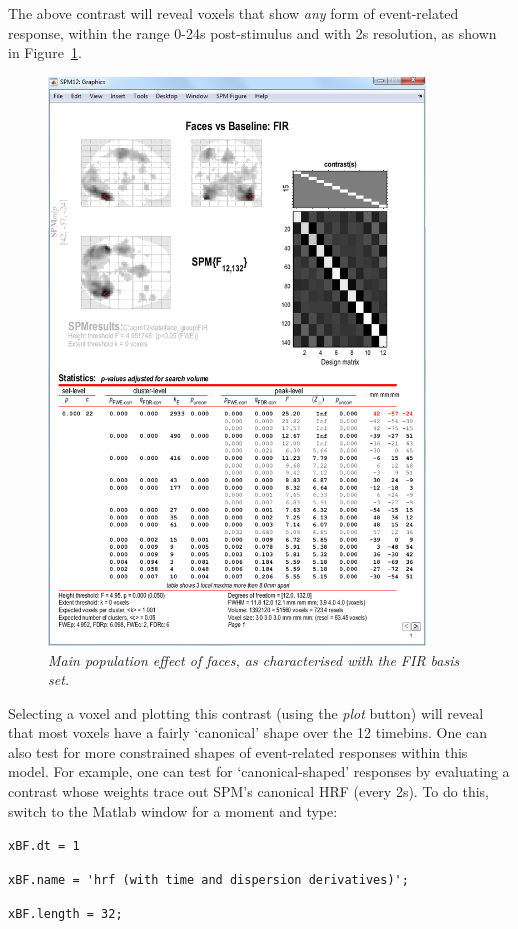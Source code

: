 The above contrast will reveal voxels that show {\em any} form of event-related response, within the range 0-24s post-stimulus and with 2s resolution, as shown in Figure~\ref{fir_results}. 
\begin{figure}
\begin{center}
\includegraphics[width=100mm]{fir_results}
\caption{\em Main population effect of faces, as characterised with the FIR basis set. \label{fir_results}}
\end{center}
\end{figure}
Selecting a voxel and plotting this contrast (using the {\em plot} button) will reveal that most voxels have a fairly `canonical' shape over the 12 timebins.
One can also test for more constrained shapes of event-related responses within this model. For example, one can test for `canonical-shaped' responses by evaluating a contrast whose weights trace out SPM's canonical HRF (every 2s). To do this, switch to the Matlab window for a moment and type:
\bi
\item{\verb!xBF.dt = 1!}
\item{\verb!xBF.name = 'hrf (with time and dispersion derivatives)';!}
\item{\verb!xBF.length = 32;!}
